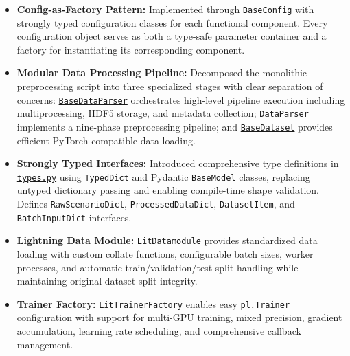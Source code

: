 \begin{itemize}[leftmargin=*]
    \item \textbf{Config-as-Factory Pattern:} Implemented through \href{https://github.com/JanDuchscherer104/UniTraj/blob/main/unitraj/utils/base_config.py}{\texttt{BaseConfig}} with strongly typed configuration classes for each functional component. Every configuration object serves as both a type-safe parameter container and a factory for instantiating its corresponding component.

    \item \textbf{Modular Data Processing Pipeline:} Decomposed the monolithic preprocessing script into three specialized stages with clear separation of concerns: \href{https://github.com/JanDuchscherer104/UniTraj/blob/main/unitraj/datasets/base_dataparser.py}{\texttt{BaseDataParser}} orchestrates high-level pipeline execution including multiprocessing, HDF5 storage, and metadata collection; \href{https://github.com/JanDuchscherer104/UniTraj/blob/main/unitraj/datasets/dataparser.py}{\texttt{DataParser}} implements a nine-phase preprocessing pipeline; and \href{https://github.com/JanDuchscherer104/UniTraj/blob/main/unitraj/datasets/base_dataset.py}{\texttt{BaseDataset}} provides efficient PyTorch-compatible data loading.

    \item \textbf{Strongly Typed Interfaces:} Introduced comprehensive type definitions in \href{https://github.com/JanDuchscherer104/UniTraj/blob/main/unitraj/datasets/types.py}{\texttt{types.py}} using \texttt{TypedDict} and Pydantic \texttt{BaseModel} classes, replacing untyped dictionary passing and enabling compile-time shape validation. Defines \texttt{RawScenarioDict}, \texttt{ProcessedDataDict}, \texttt{DatasetItem}, and \texttt{BatchInputDict} interfaces.
    \item \textbf{Lightning Data Module:} \href{https://github.com/JanDuchscherer104/UniTraj/blob/main/unitraj/lightning/lit_datamodule.py}{\texttt{LitDatamodule}} provides standardized data loading with custom collate functions, configurable batch sizes, worker processes, and automatic train/validation/test split handling while maintaining original dataset split integrity.
    \item \textbf{Trainer Factory:} \href{https://github.com/JanDuchscherer104/UniTraj/blob/main/unitraj/lightning/lit_trainer_factory.py}{\texttt{LitTrainerFactory}} enables easy \texttt{pl.Trainer} configuration with support for multi-GPU training, mixed precision, gradient accumulation, learning rate scheduling, and comprehensive callback management.
\end{itemize}

